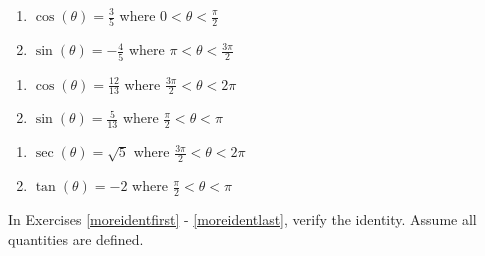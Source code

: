 \documentclass{ximera}
\begin{document}
\begin{multicols}{2}

\begin{enumerate}

\setcounter{enumi}{\value{HW}}

\item  $\cos(\theta) = \frac{3}{5}$ where $0 < \theta < \frac{\pi}{2}$
\item  $\sin(\theta) = -\frac{4}{5}$ where $\pi < \theta < \frac{3\pi}{2}$

\setcounter{HW}{\value{enumi}}

\end{enumerate}

\end{multicols}

\begin{multicols}{2}

\begin{enumerate}

\setcounter{enumi}{\value{HW}}

\item  $\cos(\theta) = \frac{12}{13}$ where $\frac{3\pi}{2} < \theta < 2\pi$
\item  $\sin(\theta) = \frac{5}{13}$ where $\frac{\pi}{2} < \theta < \pi$

\setcounter{HW}{\value{enumi}}

\end{enumerate}

\end{multicols}

\begin{multicols}{2}

\begin{enumerate}

\setcounter{enumi}{\value{HW}}

\item  $\sec(\theta) = \sqrt{5}$ where $\frac{3\pi}{2} < \theta < 2\pi$
\item  $\tan(\theta) = -2$ where $\frac{\pi}{2} < \theta < \pi$ \label{doublehalflast}

\setcounter{HW}{\value{enumi}}

\end{enumerate}

\end{multicols}



In Exercises \ref{moreidentfirst} - \ref{moreidentlast}, verify the identity.  Assume all quantities are defined.
\end{document}
